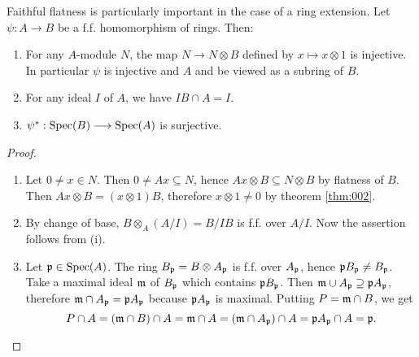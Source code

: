 \documentclass[../main]{subfiles}
\begin{document}
\newparagraph Faithful flatness is particularly important in the case of a ring extension. Let $\psi : A \longrightarrow B$ be a f.f. homomorphism of rings. Then:
\begin{enumerate}[label=(\roman*)]
    \item For any $A$-module $N$, the map $N \longrightarrow N \otimes B$ defined by $x \mapsto x \otimes 1$ is injective. In particular $\psi$ is injective and $A$ and be viewed as a subring of $B$.
    \item For any ideal $I$ of $A$, we have $IB \cap A = I$.
    \item $\psi^\ast : \operatorname{Spec}(B) \longrightarrow \operatorname{Spec}(A)$ is surjective.
\end{enumerate}
\begin{proof}
\begin{enumerate}[label=(\roman*)]
    \item Let $0 \ne x \in N$. Then $0 \ne Ax \subseteq N$, hence $Ax \otimes B \subseteq N \otimes B$ by flatness of $B$. Then $Ax \otimes B = (x \otimes 1)B$, therefore $x \otimes 1 \ne 0$ by theorem \ref{thm:002}.
    \item  By change of base, $B \otimes_A (A/I) = B/IB$ is f.f. over $A/I$. Now the assertion follows from (i).
    \item Let $\mathfrak{p} \in \operatorname{Spec}(A)$. The ring $B_{\mathfrak{p}} = B \otimes A_{\mathfrak{p}}$ is f.f. over $A_{\mathfrak{p}}$, hence $\mathfrak{p}B_{\mathfrak{p}} \ne B_{\mathfrak{p}}$. Take a maximal ideal $\mathfrak{m}$ of $B_{\mathfrak{p}}$ which contains $\mathfrak{p}B_{\mathfrak{p}}$. Then $\mathfrak{m} \cup A_{\mathfrak{p}} \supseteq \mathfrak{p}A_{\mathfrak{p}}$, therefore $\mathfrak{m} \cap A_{\mathfrak{p}} = \mathfrak{p}A_{\mathfrak{p}}$ because $\mathfrak{p}A_{\mathfrak{p}}$ is maximal. Putting $P = \mathfrak{m} \cap B$, we get \[P \cap A = (\mathfrak{m} \cap B) \cap A = \mathfrak{m} \cap A = (\mathfrak{m} \cap A_{\mathfrak{p}}) \cap A = \mathfrak{p}A_{\mathfrak{p}} \cap A = \mathfrak{p}.\]
\end{enumerate}
\end{proof}
\end{document}
